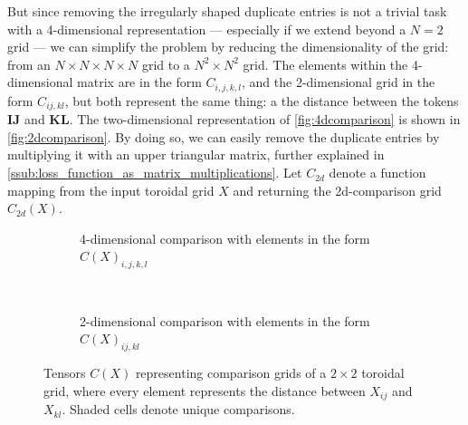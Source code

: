But since removing the irregularly shaped duplicate entries is not a trivial task with a 4-dimensional representation --- especially if we extend beyond a $N=2$ grid --- we can simplify the problem by reducing the dimensionality of the grid: from an $N\times N\times N\times N$ grid to a $N^2\times N^2$ grid. The elements within the 4-dimensional matrix are in the form $C_{i,j,k,l}$, and the 2-dimensional grid in the form $C_{ij,kl}$, but both represent the same thing: a the distance between the tokens $\bm{IJ}$ and $\bm{KL}$. The two-dimensional representation of \autoref{fig:4dcomparison} is shown in \autoref{fig:2dcomparison}. By doing so, we can easily remove the duplicate entries by multiplying it with an upper triangular matrix, further explained in \ref{ssub:loss_function_as_matrix_multiplications}. Let $C_{2d}$ denote a function mapping from the input toroidal grid $X$ and returning the 2d-comparison grid $C_{2d}(X)$.
\begin{figure}[htpb]
    \centering
    \begin{subfigure}[t]{0.5\textwidth}
    \begin{center}
    \end{center}
    \caption{4-dimensional comparison with elements in the form $C(X)_{i,j,k,l}$}
    \label{fig:4dcomparison}
    \end{subfigure}%
    ~
    \begin{subfigure}[t]{0.5\textwidth}
    \begin{center}
    \end{center}
    \caption{2-dimensional comparison with elements in the form $C(X)_{ij,kl}$}
    \label{fig:2dcomparison}
    \end{subfigure}

    \caption{Tensors $C(X)$ representing comparison grids of a $2\times 2$ toroidal grid, where every element represents the distance between $X_{ij}$ and $X_{kl}$. Shaded cells denote unique comparisons.}%
    \label{fig:comparisonGrids}
\end{figure}

